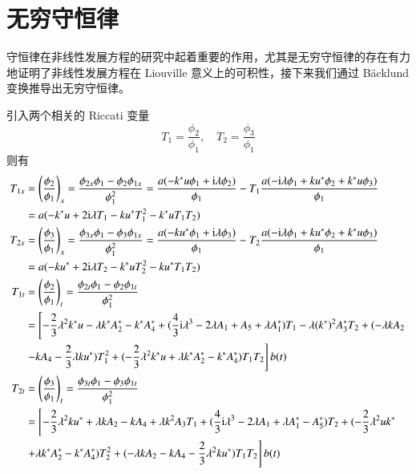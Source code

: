 \section{无穷守恒律}
守恒律在非线性发展方程的研究中起着重要的作用，尤其是无穷守恒律的存在有力地证明了非线性发展方程在 Liouville 意义上的可积性，接下来我们通过 B\"{a}cklund 变换推导出无穷守恒律。

引入两个相关的 Riccati 变量
\begin{equation}
  T_{1} = \frac{\phi_{2}}{\phi_{1}}, \quad T_{2} = \frac{\phi_{3}}{\phi_{1}}
\end{equation}
则有
\begin{align}
  T_{1x} &= \left(\frac{\phi_2}{\phi_1}\right)_x=\frac{\phi_{2x}\phi_1-\phi_2\phi_{1x}}{\phi_1^2}=\frac{a(-k^*u\phi_1+\mathrm{i}\lambda\phi_2)}{\phi_1}-T_1\frac{a(-\mathrm{i}\lambda\phi_1+ku^*\phi_2+k^*u\phi_3)}{\phi_1}\nonumber\\
  &= a(-k^{*}u + 2\mathrm{i}\lambda T_{1} - ku^{*}T_{1}^{2} - k^{*}uT_{1}T_{2}) \label{nss-t1x} \\
  T_{2x} &=\left(\frac{\phi_3}{\phi_1}\right)_x=\frac{\phi_{3x}\phi_1-\phi_3\phi_{1x}}{\phi_1^2}=\frac{a(-ku^*\phi_1+\mathrm{i}\lambda\phi_3)}{\phi_1}-T_2\frac{a(-\mathrm{i}\lambda\phi_1+ku^*\phi_2+k^*u\phi_3)}{\phi_1}\nonumber\\
  &= a(-ku^{*} + 2\mathrm{i}\lambda T_{2} - k^{*}uT_{2}^{2} - ku^{*}T_{1}T_{2}) \label{nss-t2x} \\
  T_{1t}  &=\left(\frac{\phi_2}{\phi_1}\right)_t=\frac{\phi_{2t}\phi_1-\phi_2\phi_{1t}}{\phi_1^2}\nonumber\\
  &= \left[-\frac{2}{3}\lambda^{2}k^{*}u - \lambda k^{*}A_{2}^{*} - k^{*}A_{4}^{*} + (\frac{4}{3}\mathrm{i}\lambda^{3}-2\lambda A_{1}+A_{5}+\lambda A_{1}^{*})T_{1} - \lambda (k^{*})^{2}A_{3}^{*}T_{2} + (-\lambda kA_{2} \right.\notag\\
  & \left. - kA_{4} - \frac{2}{3}\lambda ku^{*})T_{1}^{2} + (-\frac{2}{3}\lambda^{2}k^{*}u+\lambda k^{*}A_{2}^{*}-k^{*}A_{4}^{*})T_{1}T_{2} \right]b(t) \\
  T_{2t} &=\left(\frac{\phi_3}{\phi_1}\right)_t=\frac{\phi_{3t}\phi_1-\phi_3\phi_{1t}}{\phi_1^2}\nonumber\\
  &= \left[-\frac{2}{3}\lambda^{2}ku^{*} + \lambda kA_{2} - kA_{4} + \lambda k^{2}A_{3}T_{1} + (\frac{4}{3}\mathrm{i}\lambda^{3}-2\lambda A_{1}+\lambda A_{1}^{*}-A_{5}^{*})T_{2} + (-\frac{2}{3}\lambda^{2}uk^{*} \right. \notag\\
  & \left. +\lambda k^{*}A_{2}^{*}-k^{*}A_{4}^{*})T_{2}^{2} + (-\lambda kA_{2}-kA_{4}-\frac{2}{3}\lambda^{2}ku^{*})T_{1}T_{2} \right]b(t)
\end{align}
